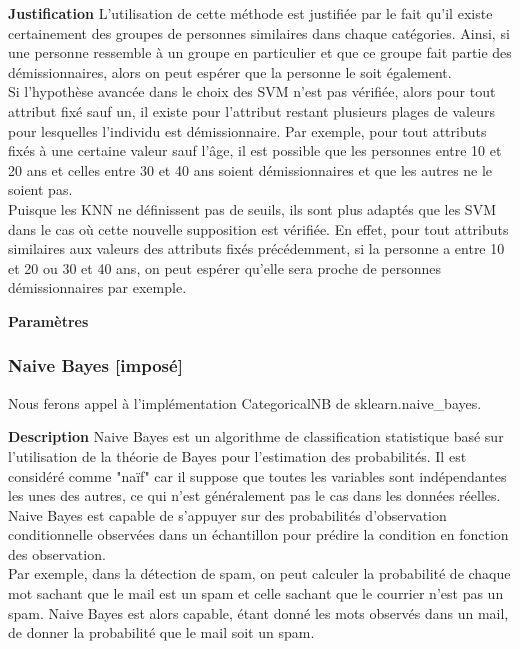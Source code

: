 \documentclass{ceri/sty/rapport}
\begin{document}
\textbf{Justification}
L'utilisation de cette méthode est justifiée par le fait qu'il existe certainement des groupes de personnes similaires dans chaque catégories. Ainsi, si une personne ressemble à un groupe en particulier et que ce groupe fait partie des démissionnaires, alors on peut espérer que la personne le soit également.\\
Si l'hypothèse avancée dans le choix des SVM n'est pas vérifiée, alors pour tout attribut fixé sauf un, il existe pour l'attribut restant plusieurs plages de valeurs pour lesquelles l'individu est démissionnaire. Par exemple, pour tout attributs fixés à une certaine valeur sauf l'âge, il est possible que les personnes entre 10 et 20 ans et celles entre 30 et 40 ans soient démissionnaires et que les autres ne le soient pas.\\
Puisque les KNN ne définissent pas de seuils, ils sont plus adaptés que les SVM dans le cas où cette nouvelle supposition est vérifiée. En effet, pour tout attributs similaires aux valeurs des attributs fixés précédemment, si la personne a entre 10 et 20 ou 30 et 40 ans, on peut espérer qu'elle sera proche de personnes démissionnaires par exemple.

\textbf{Paramètres}


\subsubsection{Naive Bayes [imposé]}

Nous ferons appel à l'implémentation CategoricalNB de sklearn.naive\_bayes.

\textbf{Description}
Naive Bayes est un algorithme de classification statistique basé sur l'utilisation de la théorie de Bayes pour l'estimation des probabilités. Il est considéré comme "naïf" car il suppose que toutes les variables sont indépendantes les unes des autres, ce qui n'est généralement pas le cas dans les données réelles. Naive Bayes est capable de s'appuyer sur des probabilités d'observation conditionnelle observées dans un échantillon pour prédire la condition en fonction des observation.\\
Par exemple, dans la détection de spam, on peut calculer la probabilité de chaque mot sachant que le mail est un spam et celle sachant que le courrier n'est pas un spam. Naive Bayes est alors capable, étant donné les mots observés dans un mail, de donner la probabilité que le mail soit un spam.\\
\end{document}
